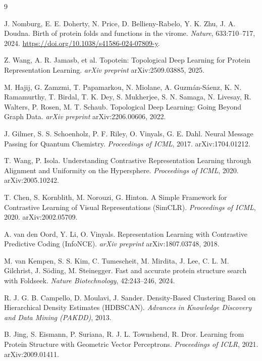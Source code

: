 \documentclass[11pt,a4paper]{article}
\theoremstyle{definition}
\begin{document}
\begin{thebibliography}{9}

J. Nomburg, E. E. Doherty, N. Price, D. Bellieny-Rabelo, Y. K. Zhu, J. A. Doudna.
\newblock Birth of protein folds and functions in the virome.
\newblock \emph{Nature}, 633:710--717, 2024.
\newblock \url{https://doi.org/10.1038/s41586-024-07809-y}.

Z. Wang, A. R. Jamasb, et al.
\newblock Topotein: Topological Deep Learning for Protein Representation Learning.
\newblock \emph{arXiv preprint} arXiv:2509.03885, 2025.

M. Hajij, G. Zamzmi, T. Papamarkou, N. Miolane, A. Guzm\'an-S\'aenz,
K. N. Ramamurthy, T. Birdal, T. K. Dey, S. Mukherjee, S. N. Samaga, N. Livesay,
R. Walters, P. Rosen, M. T. Schaub.
\newblock Topological Deep Learning: Going Beyond Graph Data.
\newblock \emph{arXiv preprint} arXiv:2206.00606, 2022.

J. Gilmer, S. S. Schoenholz, P. F. Riley, O. Vinyals, G. E. Dahl.
\newblock Neural Message Passing for Quantum Chemistry.
\newblock \emph{Proceedings of ICML}, 2017. arXiv:1704.01212.

T. Wang, P. Isola.
\newblock Understanding Contrastive Representation Learning through Alignment and
Uniformity on the Hypersphere.
\newblock \emph{Proceedings of ICML}, 2020. arXiv:2005.10242.

T. Chen, S. Kornblith, M. Norouzi, G. Hinton.
\newblock A Simple Framework for Contrastive Learning of Visual Representations
(SimCLR).
\newblock \emph{Proceedings of ICML}, 2020. arXiv:2002.05709.

A. van den Oord, Y. Li, O. Vinyals.
\newblock Representation Learning with Contrastive Predictive Coding (InfoNCE).
\newblock \emph{arXiv preprint} arXiv:1807.03748, 2018.

M. van Kempen, S. S. Kim, C. Tumescheit, M. Mirdita, J. Lee, C. L. M. Gilchrist,
J. S\"oding, M. Steinegger.
\newblock Fast and accurate protein structure search with Foldseek.
\newblock \emph{Nature Biotechnology}, 42:243--246, 2024.

R. J. G. B. Campello, D. Moulavi, J. Sander.
\newblock Density-Based Clustering Based on Hierarchical Density Estimates
(HDBSCAN).
\newblock \emph{Advances in Knowledge Discovery and Data Mining (PAKDD)}, 2013.

B. Jing, S. Eismann, P. Suriana, R. J. L. Townshend, R. Dror.
\newblock Learning from Protein Structure with Geometric Vector Perceptrons.
\newblock \emph{Proceedings of ICLR}, 2021. arXiv:2009.01411.


\end{thebibliography}
\end{document}
